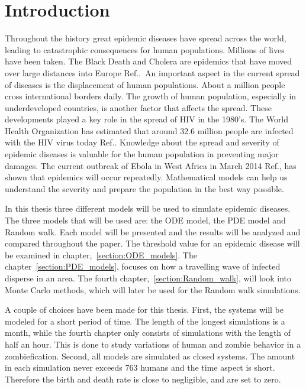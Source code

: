 \documentclass[%
twoside,                 %
final,                   %
chapterprefix=true,      %
open=right               %
10pt]{book}
\begin{document}
\chapter{Introduction}
Throughout the history great epidemic diseases have spread across the world, leading to catastrophic consequences for human populations. Millions of lives have been taken. The Black Death and Cholera are epidemics that have moved over large distances into Europe Ref.\cite[p.~315]{murray2002mathematical}.~An important aspect in the current spread of diseases is the displacement of human populations. About a million people cross international borders daily. The growth of human population, especially in underdeveloped countries, is another factor that affects the spread. These developments played a key role in the spread of HIV in the 1980's. The World Health Organization has estimated that around 32.6 million people are infected with the HIV virus today Ref.\cite{who_hiv}. Knowledge about the spread and severity of epidemic diseases is valuable for the human population in preventing major damages. The current outbreak of Ebola in West Africa in March 2014 Ref.\cite{ebola}, has shown that epidemics will occur repeatedly. Mathematical models can help us understand the severity and prepare the population in the best way possible.


\vspace{3mm}




\vspace{3mm}


In this thesis three different models will be used to simulate epidemic diseases. The three models that will be used are: the ODE model, the PDE model and Random walk. Each model will be presented and the results will be analyzed and compared throughout the paper. The threshold value for an epidemic disease will be examined in chapter,~\ref{section:ODE_models}. The chapter~\ref{section:PDE_models}, focuses on how a travelling wave of infected disperse in an area. The fourth chapter,~\ref{section:Random_walk}, will look into Monte Carlo methods, which will later be used for the Random walk simulations. 


\vspace{3mm}




\vspace{3mm}


A couple of choices have been made for this thesis. First, the systems will be modeled for a short period of time. The length of the longest simulations is a month, while the fourth chapter only consists of simulations with the length of half an hour. This is done to study variations of human and zombie behavior in a zombiefication. Second, all models are simulated as closed systems. The amount in each simulation never exceeds 763 humans and the time aspect is short. Therefore the birth and death rate is close to negligible, and are set to zero.    
\end{document}
